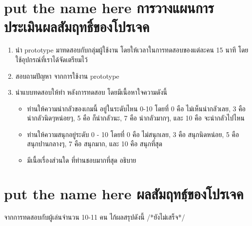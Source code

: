 \section{\ifenglish put the name here \else การวางแผนการประเมินผลสัมฤทธิ์ของโปรเจค\fi}
\begin{enumerate}
    \item นำ prototype มาทดสอบกับกลุ่มผู้ใช้งาน โดยให้เวลาในการทดสอบของแต่ละคน 15 นาที โดยใช้อุปกรณ์ที่เราได้จัดเตรียมไว้
    \item สอบถามปัญหา จากการใช้งาน prototype
    \item นำแบบทดสอบให้ทำ หลังการทดสอบ โดยมีเนื้อหาใจความดังนี้
    \begin{itemize}
        \item ท่านให้ความน่ากลัวของเกมนี้ อยู่ในระดับไหน 0-10 โดยที่ 0 คือ ไม่เห็นน่ากลัวเลย, 3 คือ น่ากลัวนิดๆหน่อยๆ, 5 คือ ก็น่ากลัวนะ, 7 คือ น่ากลัวมากๆ, และ 10 คือ จะน่ากลัวไปไหน
        \item ท่านให้ความสนุกอยู่ระดับ 0 - 10 โดยที่ 0 คือ ไม่สนุกเลย, 3 คือ สนุกนิดหน่อย, 5 คือ สนุกปานกลางๆ, 7 คือ สนุกมาก, และ 10 คือ สนุกที่สุด
        \item มีเนื้อเรื่องส่วนใด ที่ท่านชอบมากที่สุด อธิบาย
    \end{itemize}
\end{enumerate}
\section{\ifenglish put the name here \else ผลสัมฤทธฺ์ของโปรเจค\fi}
จากการทดสอบกับผู้เล่นจำนวน 10-11 คน ไก้ผลสรุปดังนี้
/*ยังไม่เสร็จ*/


